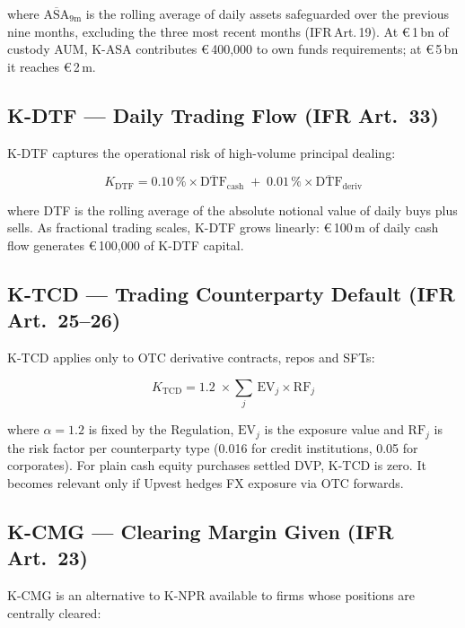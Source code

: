 \documentclass[12pt,a4paper]{report}
\newcommand{\eur}{\euro\,}
\begin{document}
where $\overline{\text{ASA}}_{9\text{m}}$ is the rolling average of daily assets
safeguarded over the previous nine months, excluding the three most recent months
(IFR\,Art.\,19). At \eur{}1\,bn of custody AUM, K-ASA contributes \eur{}400{,}000 to
own funds requirements; at \eur{}5\,bn it reaches \eur{}2\,m.

\subsection{K-DTF --- Daily Trading Flow (IFR Art.\ 33)}

K-DTF captures the operational risk of high-volume principal dealing:

\begin{equation}
  K_{\text{DTF}} = 0.10\,\% \times \overline{\text{DTF}}_{\text{cash}}
  \;+\; 0.01\,\% \times \overline{\text{DTF}}_{\text{deriv}}
  \label{eq:kdtf}
\end{equation}

where DTF is the rolling average of the absolute notional value of daily buys plus
sells. As fractional trading scales, K-DTF grows linearly: \eur{}100\,m of daily
cash flow generates \eur{}100{,}000 of K-DTF capital.

\subsection{K-TCD --- Trading Counterparty Default (IFR Art.\ 25--26)}

K-TCD applies only to OTC derivative contracts, repos and SFTs:

\begin{equation}
  K_{\text{TCD}} = 1.2 \;\times \sum_{j}\, \text{EV}_{j} \times \text{RF}_{j}
  \label{eq:ktcd}
\end{equation}

where $\alpha=1.2$ is fixed by the Regulation, $\text{EV}_{j}$ is the exposure value and
$\text{RF}_{j}$ is the risk factor per counterparty type (0.016 for credit
institutions, 0.05 for corporates). For plain cash equity purchases settled DVP,
K-TCD is zero. It becomes relevant only if Upvest hedges FX exposure via OTC forwards.

\subsection{K-CMG --- Clearing Margin Given (IFR Art.\ 23)}

K-CMG is an alternative to K-NPR available to firms whose positions are centrally
cleared:
\end{document}
